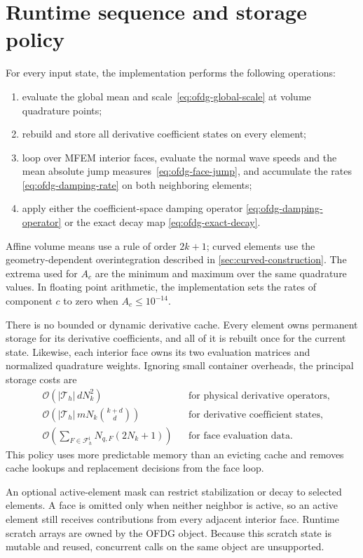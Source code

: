 \section{Runtime sequence and storage policy}

For every input state, the implementation performs the following operations:
\begin{enumerate}
  \item evaluate the global mean and scale~\eqref{eq:ofdg-global-scale} at volume
        quadrature points;
  \item rebuild and store all derivative coefficient states on every element;
  \item loop over MFEM interior faces, evaluate the normal wave speeds and the
        mean absolute jump measures~\eqref{eq:ofdg-face-jump}, and accumulate the rates
        \eqref{eq:ofdg-damping-rate} on both neighboring elements;
  \item apply either the coefficient-space damping operator
        \eqref{eq:ofdg-damping-operator} or the exact decay map
        \eqref{eq:ofdg-exact-decay}.
\end{enumerate}
Affine volume means use a rule of order $2k+1$; curved elements use the geometry-dependent overintegration described in \cref{sec:curved-construction}.  The extrema used for
$A_c$ are the minimum and maximum over the same quadrature values.  In floating
point arithmetic, the implementation sets the rates of component $c$ to zero when
$A_c\leq 10^{-14}$.

There is no bounded or dynamic derivative cache.  Every element owns permanent
storage for its derivative coefficients, and all of it is rebuilt once for the
current state.  Likewise, each interior face owns its two evaluation matrices and
normalized quadrature weights.  Ignoring small container overheads, the principal
storage costs are
\begin{align}
  &\mathcal{O}\left(
    |\mathcal{T}_h|\,dN_k^2
    \right)
  &&\text{for physical derivative operators},\\
  &\mathcal{O}\left(
    |\mathcal{T}_h|\,mN_k\binom{k+d}{d}
    \right)
  &&\text{for derivative coefficient states},\\
  &\mathcal{O}\left(
    \sum_{F\in\mathcal{F}_h^{\mathrm{i}}}N_{q,F}(2N_k+1)
    \right)
  &&\text{for face evaluation data}.
\end{align}
This policy uses more predictable memory than an evicting cache and removes cache
lookups and replacement decisions from the face loop.

An optional active-element mask can restrict stabilization or decay to selected
elements.  A face is omitted only when neither neighbor is active, so an active
element still receives contributions from every adjacent interior face. Runtime
scratch arrays are owned by the OFDG object. Because this scratch state is
mutable and reused, concurrent calls on the same object are unsupported.

